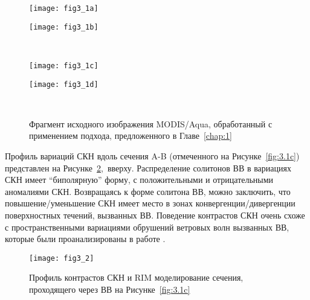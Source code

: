 \begin{figure}[H]
   	\centering
	\begin{minipage}{.47\textwidth}
	    \subcaptionbox{\label{fig:3.1a}}
		{\texttt{[image: fig3\_1a]}}
	\end{minipage}
	\hfill
	\begin{minipage}{.47\textwidth}
	    \subcaptionbox{\label{fig:3.1b}}
		{\texttt{[image: fig3\_1b]}}
	\end{minipage}
	\\
	\begin{minipage}{.47\textwidth}
	    \subcaptionbox{\label{fig:3.1c}}
		{\texttt{[image: fig3\_1c]}}
	\end{minipage}
	\hfill
	\begin{minipage}{.47\textwidth}
	    \subcaptionbox{\label{fig:3.1d}}
		{\texttt{[image: fig3\_1d]}}
	\end{minipage}
    \\
    \caption{Фрагмент исходного изображения MODIS/Aqua, обработанный с применением подхода, предложенного в Главе~\ref{chap:1}}
    \label{fig:3.1}
\end{figure}


Профиль вариаций СКН вдоль сечения A-B (отмеченного на Рисунке~\ref{fig:3.1c}) представлен на Рисунке~\ref{fig:3.2},~вверху. Распределение солитонов ВВ в вариациях СКН имеет ``биполярную'' форму, с положительными и отрицательными аномалиями СКН. Возвращаясь к форме солитона ВВ, можно заключить, что повышение/уменьшение СКН имеет место в зонах конвергенции/дивергенции поверхностных течений, вызванных ВВ. Поведение контрастов СКН очень схоже с пространственными вариациями обрушений ветровых волн вызванных ВВ, которые были проанализированы в работе \citep{1986}.



\begin{figure}[H]
    \texttt{[image: fig3\_2]}
    \caption{Профиль контрастов СКН и RIM моделирование сечения, проходящего через ВВ на Рисунке~\ref{fig:3.1c}}
    \label{fig:3.2}
\end{figure}


